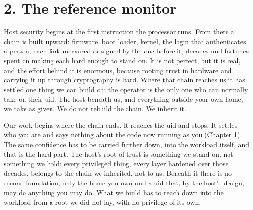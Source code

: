\hypertarget{the-reference-monitor}{%
\chapter{2. The reference monitor}\label{the-reference-monitor}}

Host security begins at the first instruction the processor runs. From
there a chain is built upward: firmware, boot loader, kernel, the login
that authenticates a person, each link measured or signed by the one
before it, decades and fortunes spent on making each hard enough to
stand on. It is not perfect, but it is real, and the effort behind it is
enormous, because rooting trust in hardware and carrying it up through
cryptography is hard. Where that chain reaches us it has settled one
thing we can build on: the operator is the only one who can normally
take on their uid. The host beneath us, and everything outside your own
home, we take as given. We do not rebuild the chain. We inherit it.

Our work begins where the chain ends. It reaches the uid and stops. It
settles who you are and says nothing about the code now running as you
(Chapter 1). The same confidence has to be carried further down, into
the workload itself, and that is the hard part. The host's root of trust
is something we stand on, not something we hold: every privileged thing,
every layer hardened over those decades, belongs to the chain we
inherited, not to us. Beneath it there is no second foundation, only the
home you own and a uid that, by the host's design, may do anything you
may do. What we build has to reach down into the workload from a root we
did not lay, with no privilege of its own.

